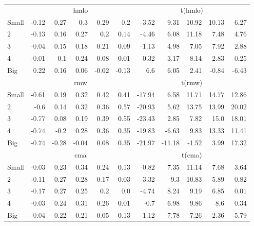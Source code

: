 \begin{table}[!ht]
\begin{tabular}{lrrrrrrrrrr}
  

      & \multicolumn{5}{c}{hmlo} & \multicolumn{5}{c}{t(hmlo)} \\
    \cmidrule(r){2-6} \cmidrule(r){7-11}
      Small  & -0.12  & 0.27  & 0.3  & 0.29  & 0.2   & -3.52  & 9.31  & 10.92  & 10.13  & 6.27  \\
          2  & -0.13  & 0.16  & 0.27  & 0.2  & 0.14   & -4.46  & 6.08  & 11.18  & 7.48  & 4.76  \\
          3  & -0.04  & 0.15  & 0.18  & 0.21  & 0.09   & -1.13  & 4.98  & 7.05  & 7.92  & 2.88  \\
          4  & -0.01  & 0.1  & 0.24  & 0.08  & 0.01   & -0.32  & 3.17  & 8.14  & 2.83  & 0.25  \\
      Big    & 0.22  & 0.16  & 0.06  & -0.02  & -0.13   & 6.6  & 6.05  & 2.41  & -0.84  & -6.43  \\

  

      & \multicolumn{5}{c}{rmw} & \multicolumn{5}{c}{t(rmw)} \\
    \cmidrule(r){2-6} \cmidrule(r){7-11}
      Small  & -0.61  & 0.19  & 0.32  & 0.42  & 0.41   & -17.94  & 6.58  & 11.71  & 14.77  & 12.86  \\
          2  & -0.6  & 0.14  & 0.32  & 0.36  & 0.57   & -20.93  & 5.62  & 13.75  & 13.99  & 20.02  \\
          3  & -0.77  & 0.08  & 0.19  & 0.39  & 0.55   & -23.43  & 2.85  & 7.82  & 15.0  & 18.01  \\
          4  & -0.74  & -0.2  & 0.28  & 0.36  & 0.35   & -19.83  & -6.63  & 9.83  & 13.33  & 11.41  \\
      Big    & -0.74  & -0.28  & -0.04  & 0.08  & 0.35   & -21.97  & -11.18  & -1.52  & 3.99  & 17.32  \\

  

      & \multicolumn{5}{c}{cma} & \multicolumn{5}{c}{t(cma)} \\
    \cmidrule(r){2-6} \cmidrule(r){7-11}
      Small  & -0.03  & 0.23  & 0.34  & 0.24  & 0.13   & -0.82  & 7.35  & 11.14  & 7.68  & 3.64  \\
          2  & -0.11  & 0.27  & 0.28  & 0.17  & 0.03   & -3.32  & 9.3  & 10.83  & 5.89  & 0.82  \\
          3  & -0.17  & 0.27  & 0.25  & 0.2  & 0.0   & -4.74  & 8.24  & 9.19  & 6.85  & 0.01  \\
          4  & -0.03  & 0.24  & 0.31  & 0.26  & 0.01   & -0.7  & 6.98  & 9.86  & 8.6  & 0.34  \\
      Big    & -0.04  & 0.22  & 0.21  & -0.05  & -0.13   & -1.12  & 7.78  & 7.26  & -2.36  & -5.79  \\

  

  \bottomrule
\end{tabular}
\label{tbl:25_Size_OP_FF2015}
\end{table}